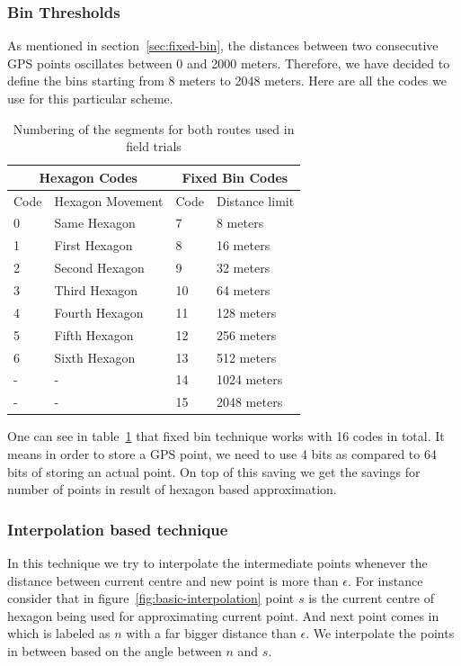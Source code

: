 \documentclass[conference]{IEEEtran}
\begin{document}
\subsubsection{Bin Thresholds}
As mentioned in section~\ref{sec:fixed-bin}, the distances between two consecutive GPS points oscillates between 0 and 
2000 meters. Therefore, we have decided to define the bins starting from 8 meters to 2048 meters. Here are all the codes 
we use for this particular scheme.

\begin{table}[h]
\caption{Numbering of the segments for both routes used in field trials}
\label{tbl:fixed-bin-codes}
\begin{center}
    \begin{tabular}{  |l|l|l|l|  }
	\hline
\multicolumn{2}{|c|}{Hexagon Codes} &\multicolumn{2}{|c|}{Fixed Bin Codes} \\\hline
 Code & Hexagon Movement & Code & Distance limit \\ \hline
0&Same Hexagon&7& 8 meters\\ \hline
1&First Hexagon&8&16 meters \\ \hline
2&Second Hexagon&9& 32 meters\\ \hline
3&Third Hexagon&10&64 meters\\ \hline
4&Fourth Hexagon&11&128 meters\\ \hline
5&Fifth Hexagon&12&256 meters \\ \hline
6&Sixth Hexagon&13&512 meters \\ \hline
-&-&14&1024 meters \\ \hline
-&-&15&2048 meters \\ \hline
\end{tabular}
    \end{center}
\end{table}

One can see in table~\ref{tbl:fixed-bin-codes} that fixed bin technique works with 16 codes in total. It means in order to 
store a GPS point, we need to use 4 bits as compared to 64 bits of storing an actual point. On top of this saving we get 
the savings for number of points in result of hexagon based approximation.

\subsubsection{Interpolation based technique}

In this technique we try to interpolate the intermediate points whenever the distance between current centre and new 
point is more than $\epsilon$. For instance consider that in figure~\ref{fig:basic-interpolation} point $s$ is the current 
centre of hexagon being used for approximating current point. And next point comes in which is labeled as $n$ with a 
far bigger distance than $\epsilon$. We interpolate the points in between based on the angle between $n$ and $s$. 
\end{document}

